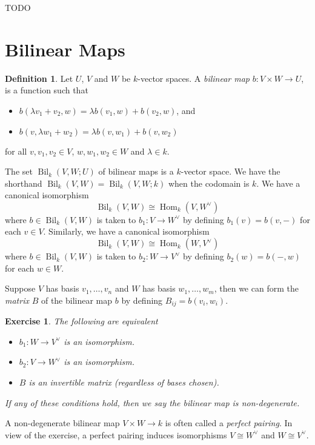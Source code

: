 \documentclass[12pt]{article}
\theoremstyle{plain}
\newtheorem{exercise}[theorem]{Exercise}
\theoremstyle{definition}
\newtheorem{definition}[theorem]{Definition}
\theoremstyle{remark}
\numberwithin{equation}{section}
\begin{document}
TODO

\section{Bilinear Maps}

\begin{definition}
Let $U$, $V$ and $W$ be $k$-vector spaces.
A \emph{bilinear map} $b: V \times W \to U$,
is a function such that
\begin{itemize}
\item $b(\lambda v_1+v_2,w) = \lambda b(v_1,w) + b(v_2,w)$, and
\item $b(v,\lambda w_1+w_2) = \lambda b(v,w_1) + b(v,w_2)$
\end{itemize}
for all $v,v_1,v_2 \in V$, $w,w_1,w_2 \in W$ and $\lambda \in k$.
\end{definition}

The set $\operatorname{Bil}_k(V,W;U)$ of bilinear maps is a $k$-vector
space.
We have the shorthand $\operatorname{Bil}_k(V,W)=\operatorname{Bil}_k(V,W;k)$
when the codomain is $k$.
We have a canonical isomorphism
\[
\operatorname{Bil}_k(V,W) \cong
\operatorname{Hom}_k(V,W^\vee)
\]
where $b \in \operatorname{Bil}_k(V,W)$ is taken to $b_1 : V \to W^\vee$
by defining $b_1(v) = b(v,-)$ for each $v \in V$.
Similarly, we have a canonical isomorphism
\[
\operatorname{Bil}_k(V,W) \cong
\operatorname{Hom}_k(W,V^\vee)
\]
where $b \in \operatorname{Bil}_k(V,W)$ is taken to $b_2 : W \to V^\vee$
by defining $b_2(w) = b(-,w)$ for each $w \in W$.

Suppose $V$ has basis $v_1,\ldots,v_n$ and $W$ has basis $w_1,\ldots, w_m$,
then we can form the \emph{matrix} $B$ of the bilinear map $b$ by defining
$B_{ij} = b(v_i,w_i)$.

\begin{exercise}
The following are equivalent
\begin{itemize}
\item $b_1 : W \to V^\vee$ is an isomorphism.
\item $b_2 : V \to W^\vee$ is an isomorphism.
\item $B$ is an invertible matrix (regardless of bases chosen).
\end{itemize}
If any of these conditions hold, then we say the bilinear map
is \emph{non-degenerate}.
\end{exercise}

A non-degenerate bilinear map $V \times W \to k$ is often called
a \emph{perfect pairing}.  In view of the exercise, a perfect pairing
induces isomorphisms $V \cong W^\vee$ and $W \cong V^\vee$.
\end{document}
